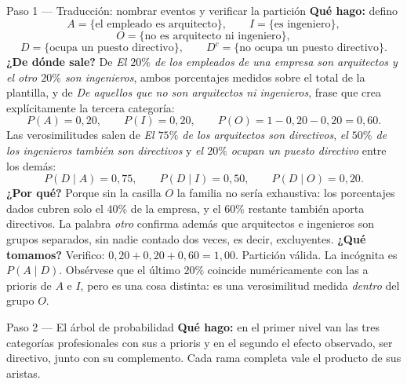 \documentclass[11pt]{article}
\begin{document}
\begin{sol}

\begin{paso}{Paso 1 --- Traducción: nombrar eventos y verificar la partición}
\textbf{Qué hago:} defino
\[
A=\{\text{el empleado es arquitecto}\},\qquad I=\{\text{es ingeniero}\},
\]
\[
O=\{\text{no es arquitecto ni ingeniero}\},
\]
\[
D=\{\text{ocupa un puesto directivo}\},\qquad D^{c}=\{\text{no ocupa un puesto directivo}\}.
\]
\textbf{¿De dónde sale?} De \emph{El $20\%$ de los empleados de una empresa son arquitectos y el otro $20\%$ son ingenieros}, ambos porcentajes medidos sobre el total de la plantilla, y de \emph{De aquellos que no son arquitectos ni ingenieros}, frase que crea explícitamente la tercera categoría:
\[
P(A)=0,20,\qquad P(I)=0,20,\qquad P(O)=1-0,20-0,20=0,60 .
\]
Las verosimilitudes salen de \emph{El $75\%$ de los arquitectos son directivos}, \emph{el $50\%$ de los ingenieros también son directivos} y \emph{el $20\%$ ocupan un puesto directivo} entre los demás:
\[
P(D\mid A)=0,75,\qquad P(D\mid I)=0,50,\qquad P(D\mid O)=0,20 .
\]
\textbf{¿Por qué?} Porque sin la casilla $O$ la familia no sería exhaustiva: los porcentajes dados cubren solo el $40\%$ de la empresa, y el $60\%$ restante también aporta directivos. La palabra \emph{otro} confirma además que arquitectos e ingenieros son grupos separados, sin nadie contado dos veces, es decir, excluyentes.
\textbf{¿Qué tomamos?} Verifico: $0,20+0,20+0,60=1,00$. Partición válida. La incógnita es $P(A\mid D)$. Obsérvese que el último $20\%$ coincide numéricamente con las a prioris de $A$ e $I$, pero es una cosa distinta: es una verosimilitud medida \emph{dentro} del grupo $O$.
\end{paso}

\begin{paso}{Paso 2 --- El árbol de probabilidad}
\textbf{Qué hago:} en el primer nivel van las tres categorías profesionales con sus a prioris y en el segundo el efecto observado, ser directivo, junto con su complemento. Cada rama completa vale el producto de sus aristas.

\begin{center}
\shorthandoff{<>}
\end{center}
\end{paso}
\end{sol}
\end{document}
